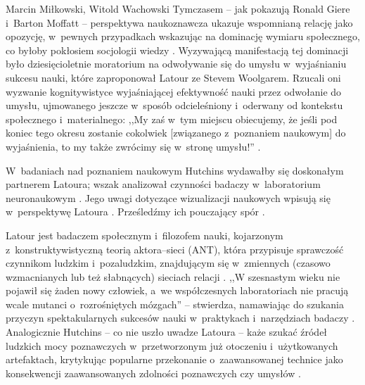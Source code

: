 \begin{artplenv2auth}{Marcin Miłkowski, Witold Wachowski}
Tymczasem -- jak pokazują Ronald Giere i~Barton Moffatt -- perspektywa naukoznawcza ukazuje wspomnianą relację jako opozycję, w~pewnych przypadkach wskazując na dominację wymiaru społecznego, co byłoby pokłosiem socjologii wiedzy
\parencites[zob. także][]{brown_science_2011}[][s.~301–302]{giere_distributed_2003}. %
 Wyzywającą manifestacją tej dominacji było dziesięcioletnie moratorium na odwoływanie się do umysłu w~wyjaśnianiu sukcesu nauki, które zaproponował Latour ze Stevem Woolgarem. Rzucali oni wyzwanie kognitywistyce wyjaśniającej efektywność nauki przez odwołanie do umysłu, ujmowanego jeszcze w~sposób odcieleśniony i~oderwany od kontekstu społecznego i~materialnego: ,,My zaś w~tym miejscu obiecujemy, że jeśli pod koniec tego okresu zostanie cokolwiek [związanego z~poznaniem naukowym] do wyjaśnienia, to my także zwrócimy się w~stronę umysłu!'' 
\parencite[][s.~366]{latour_zycie_2020}.%


W~badaniach nad poznaniem naukowym Hutchins wydawałby się doskonałym partnerem Latoura; wszak analizował czynności badaczy w~laboratorium neuronaukowym
\parencite[][]{alac_i_2004}. %
 Jego uwagi dotyczące wizualizacji naukowych wpisują się w~perspektywę Latoura 
\parencite[np.][]{latour_wizualizacja_2012}. %
 Prześledźmy ich pouczający spór 
\parencites[][]{latour_cogito_1996}[][]{engestrom_distributed_1996}.%


Latour jest badaczem społecznym i~filozofem nauki, kojarzonym z~konstruktywistyczną teorią aktora–sieci (ANT), która przypisuje sprawczość czynnikom ludzkim i~pozaludzkim, znajdującym się w~zmiennych (czasowo wzmacnianych lub też słabnących) sieciach relacji
\parencite[zob. np.][]{latour_splatajac_2010}. %
 ,,W szesnastym wieku nie pojawił się żaden nowy człowiek, a~we współczesnych laboratoriach nie pracują wcale mutanci o~rozrośniętych mózgach'' -- stwierdza, namawiając do szukania przyczyn spektakularnych sukcesów nauki w~praktykach i~narzędziach badaczy 
\parencite[][s.~208]{latour_wizualizacja_2012}. %
 Analogicznie Hutchins -- co nie uszło uwadze Latoura -- każe szukać źródeł ludzkich mocy poznawczych w~przetworzonym już otoczeniu i~użytkowanych artefaktach, krytykując popularne przekonanie o~zaawansowanej technice jako konsekwencji zaawansowanych zdolności poznawczych czy umysłów 
\parencite[][s.~169, 355]{hutchins_cognition_1995}.%



\end{artplenv2auth}
